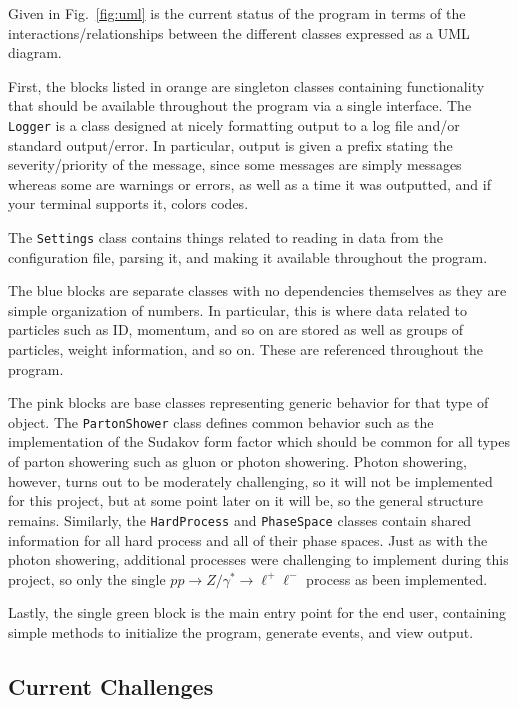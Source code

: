 Given in Fig.~\ref{fig:uml} is the current status of the program in terms of the interactions/relationships between the different classes expressed as a UML diagram.

First, the blocks listed in orange are singleton classes containing functionality that should be available throughout the program via a single interface. The \texttt{Logger} is a class designed at nicely formatting output to a log file and/or standard output/error. In particular, output is given a prefix stating the severity/priority of the message, since some messages are simply messages whereas some are warnings or errors, as well as a time it was outputted, and if your terminal supports it, colors codes.

The \texttt{Settings} class contains things related to reading in data from the configuration file, parsing it, and making it available throughout the program.

The blue blocks are separate classes with no dependencies themselves as they are simple organization of numbers. In particular, this is where data related to particles such as ID, momentum, and so on are stored as well as groups of particles, weight information, and so on. These are referenced throughout the program.

The pink blocks are base classes representing generic behavior for that type of object. The \texttt{PartonShower} class defines common behavior such as the implementation of the Sudakov form factor which should be common for all types of parton showering such as gluon or photon showering. Photon showering, however, turns out to be moderately challenging, so it will not be implemented for this project, but at some point later on it will be, so the general structure remains. Similarly, the \texttt{HardProcess} and \texttt{PhaseSpace} classes contain shared information for all hard process and all of their phase spaces. Just as with the photon showering, additional processes were challenging to implement during this project, so only the single $pp \rightarrow Z/\gamma^* \rightarrow \ell^+\ell^-$ process as been implemented.

Lastly, the single green block is the main entry point for the end user, containing simple methods to initialize the program, generate events, and view output.



\subsection{Current Challenges}

